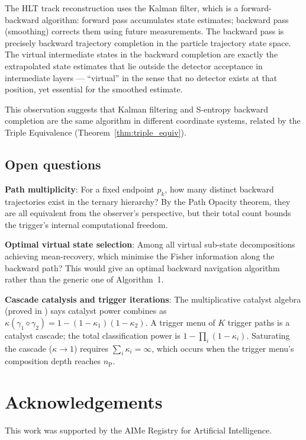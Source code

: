 \documentclass[twocolumn,10pt,a4paper]{article}
\theoremstyle{thmstyle}
\theoremstyle{definition}
\theoremstyle{remark}
\newcommand{\catpow}{\kappa}
\newcommand{\nP}{n_{\mathrm{P}}}
\begin{document}
The HLT track reconstruction uses the Kalman filter, which is a forward-backward
algorithm: forward pass accumulates state estimates; backward pass (smoothing)
corrects them using future measurements. The backward pass is precisely
backward trajectory completion in the particle trajectory state space.
The virtual intermediate states in the backward completion are exactly the
extrapolated state estimates that lie outside the detector acceptance in
intermediate layers — ``virtual'' in the sense that no detector exists at
that position, yet essential for the smoothed estimate.

This observation suggests that Kalman filtering and S-entropy backward
completion are the same algorithm in different coordinate systems, related
by the Triple Equivalence (Theorem~\ref{thm:triple_equiv}).

\subsection{Open questions}

\textbf{Path multiplicity}: For a fixed endpoint $p_k$, how many distinct
backward trajectories exist in the ternary hierarchy? By the Path Opacity
theorem, they are all equivalent from the observer's perspective, but their
total count bounds the trigger's internal computational freedom.

\textbf{Optimal virtual state selection}: Among all virtual sub-state
decompositions achieving mean-recovery, which minimise the Fisher information
along the backward path? This would give an optimal backward navigation
algorithm rather than the generic one of Algorithm~1.

\textbf{Cascade catalysis and trigger iterations}: The multiplicative catalyst
algebra (proved in \citet{companion:cascade}) says catalyst power combines
as $\catpow(\gamma_1 \diamond \gamma_2) = 1 - (1-\catpow_1)(1-\catpow_2)$.
A trigger menu of $K$ trigger paths is a catalyst cascade; the total
classification power is $1 - \prod_i (1 - \catpow_i)$. Saturating the
cascade ($\catpow \to 1$) requires $\sum_i \catpow_i = \infty$, which
occurs when the trigger menu's composition depth reaches $\nP$.

\section*{Acknowledgements}
This work was supported by the AIMe Registry for Artificial Intelligence.



\end{document}
